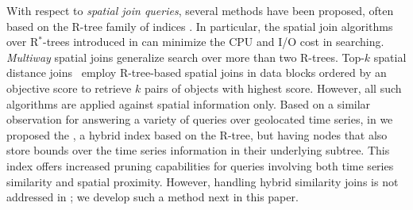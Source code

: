 

With respect to {\em spatial join queries}, several methods have been proposed, often based on the R-tree family of indices \cite{Guttman1984, Beckmann1990}. In particular, the spatial join algorithms over R$^*$-trees introduced in \cite{DBLP:conf/sigmod/BrinkhoffKS93} can minimize the CPU and I/O cost in searching. {\em Multiway} spatial joins \cite{papadias1999processing} generalize search over more than two R-trees. Top-$k$ spatial distance joins~\cite{qi2013efficient} employ R-tree-based spatial joins in data blocks ordered by an objective score to retrieve $k$ pairs of objects with highest score. However, all such algorithms are applied against spatial information only. Based on a similar observation for answering a variety of queries over geolocated time series, in \cite{chatzig17btsr} we proposed the \btsr, a hybrid index based on the R-tree, but having nodes that also store bounds over the time series information in their underlying subtree. This index offers increased pruning capabilities for queries involving both time series similarity and spatial proximity. However, handling hybrid similarity joins is not addressed in \cite{chatzig17btsr}; we develop such a method next in this paper.

